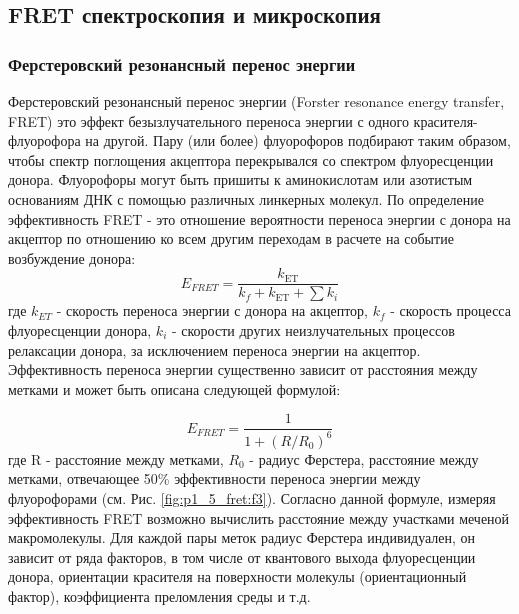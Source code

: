 \subsection{FRET спектроскопия и микроскопия}


\subsubsection{Ферстеровский резонансный перенос энергии}

    Ферстеровский резонансный перенос энергии (Forster resonance energy transfer, FRET) это эффект безызлучательного переноса энергии с одного красителя-флуорофора на другой. Пару (или более) флуорофоров подбирают таким образом, чтобы спектр поглощения акцептора перекрывался со спектром флуоресценции донора. Флуорофоры могут быть пришиты к аминокислотам или азотистым основаниям ДНК с помощью различных линкерных молекул. По определение эффективность FRET - это отношение вероятности переноса энергии с донора на акцептор по отношению ко всем другим переходам в расчете на событие возбуждение донора:
\begin{equation}
    E_{FRET} = \frac{k_\text{ET}}{k_f + k_\text{ET} + \sum{k_i}}
\end{equation}    
 где $k_{ET}$ - скорость переноса энергии с донора на акцептор, $k_f$ - скорость процесса флуоресценции донора,  $k_i$ - скорости других неизлучательных процессов релаксации донора, за исключением переноса энергии на акцептор.
    Эффективность переноса энергии существенно зависит от расстояния между метками и может быть описана следующей формулой:

\begin{equation}
    E_{FRET}=\frac{1}{1+(R/R_0)^6}
    \label{fret_E}
\end{equation}
    где R - расстояние между метками, $R_0$ - радиус
     Ферстера, расстояние между метками, отвечающее 50\% эффективности переноса энергии между флуорофорами (см. Рис. \ref{fig:p1_5_fret:f3}). Согласно данной формуле, измеряя эффективность FRET возможно вычислить расстояние между участками меченой макромолекулы. Для каждой пары меток радиус Ферстера индивидуален, он зависит от ряда факторов, в том числе от квантового выхода флуоресценции донора, ориентации красителя на поверхности молекулы (ориентационный фактор), коэффициента преломления среды и т.д. 


